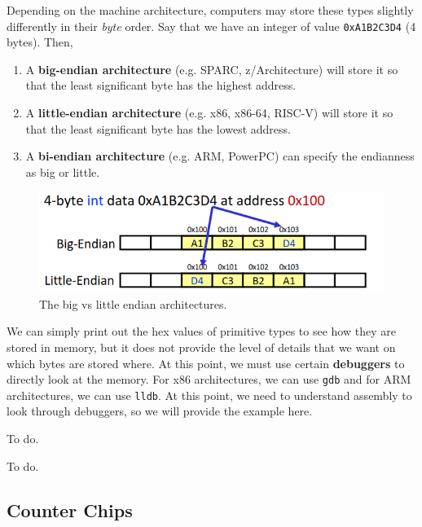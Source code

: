   \begin{definition}
    Depending on the machine architecture, computers may store these types slightly differently in their \textit{byte} order. Say that we have an integer of value \texttt{0xA1B2C3D4} (4 bytes). Then, 
    \begin{enumerate} 
      \item A \textbf{big-endian architecture} (e.g. SPARC, z/Architecture) will store it so that the least significant byte has the highest address.
      \item A \textbf{little-endian architecture} (e.g. x86, x86-64, RISC-V) will store it so that the least significant byte has the lowest address. 
      \item A \textbf{bi-endian architecture} (e.g. ARM, PowerPC) can specify the endianness as big or little. 
    \end{enumerate}

    \begin{figure}[H]
      \centering 
      \includegraphics[scale=0.4]{img/endianness.png}
      \caption{The big vs little endian architectures. } 
      \label{fig:endianness}
    \end{figure}
  \end{definition}

  We can simply print out the hex values of primitive types to see how they are stored in memory, but it does not provide the level of details that we want on which bytes are stored where. At this point, we must use certain \textbf{debuggers} to directly look at the memory. For x86 architectures, we can use \texttt{gdb} and for ARM architectures, we can use \texttt{lldb}. At this point, we need to understand assembly to look through debuggers, so we will provide the example here. 

  \begin{example}
    To do. 
  \end{example}

  \begin{example}
    To do. 
  \end{example}

\subsection{Counter Chips}
